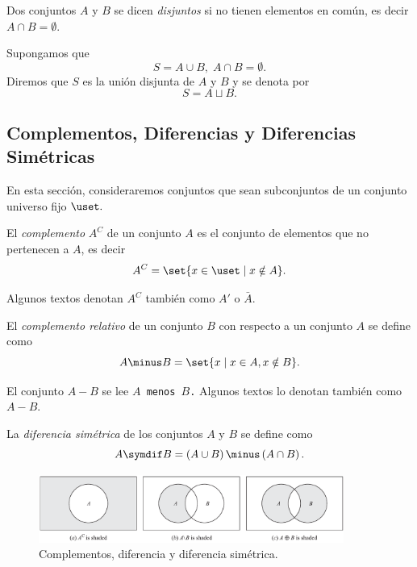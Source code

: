 	Dos conjuntos $A$ y $B$ se dicen \emph{disjuntos} si no tienen elementos en común, es decir $A\cap B=\emptyset$.
	
	
	Supongamos que 
	$$
	S=A\cup B, \; A\cap B=\emptyset.
	$$  Diremos que $S$ es la unión disjunta de $A$ y $B$ y se denota por $$S=A \sqcup B.$$ 
	


\subsection{Complementos, Diferencias y Diferencias Sim\'etricas}


	En esta sección, consideraremos conjuntos que sean subconjuntos de un conjunto universo fijo $\uset.$



	El \emph{complemento} $A^{C}$ de un conjunto $A$ es el conjunto de elementos que no pertenecen a $A$, es decir 
	$$A^{C}=\set{x\in \uset \mid x \notin A}.$$



	Algunos textos denotan $A^{C}$ tambi\'en como $A'$ o $\bar{A}.$ 



	El \emph{complemento relativo} de un conjunto $B$ con respecto a un conjunto $A$ se define como 
	$$
	A\minus B = \set{x \mid x \in A, x \notin B}.
	$$


% 
% 
% 



	El conjunto $A\minus B$ se lee \texttt{$A$ menos $B$.} Algunos textos lo denotan tambi\'en como $A-B.$  



	La \emph{diferencia sim\'etrica} de los conjuntos $A$ y $B$ se define como $$A\symdif B=\left( A\cup B \right)\minus \left( A \cap B \right).$$



	\begin{figure}
		\centering
		\includegraphics[width=10cm,keepaspectratio=true]{./md/venn_complemento.png}
		\caption{Complementos, diferencia y diferencia simétrica.}
		\label{fig:0104}
	\end{figure}
	




